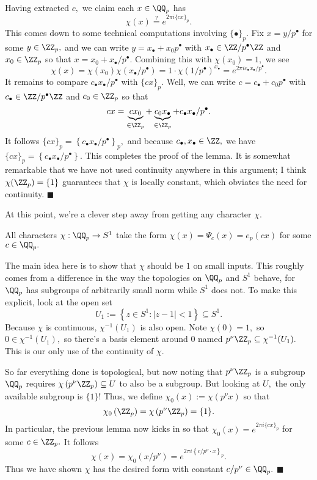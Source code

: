 Having extracted $c,$ we claim each $x\in\QQ_p$ has
\[\chi(x)\stackrel?=e^{2\pi i\{cx\}_p}.\]
This comes down to some technical computations involving $\{\bullet\}_p.$ Fix $x=y/p^\bullet$ for some $y\in\ZZ_p,$ and we can write $y=x_\bullet+x_0p^\bullet$ with $x_\bullet\in\ZZ/p^\bullet\ZZ$ and $x_0\in\ZZ_p$ so that $x=x_0+x_\bullet/p^\bullet.$ Combining this with $\chi(x_0)=1,$ we see
\[\chi(x)=\chi(x_0)\chi\left(x_\bullet/p^\bullet\right)=1\cdot\chi\left(1/p^\bullet\right)^{x_\bullet}=e^{2\pi ic_\bullet x_\bullet/p^\bullet}.\]
It remains to compare $c_\bullet x_\bullet/p^\bullet$ with $\{cx\}_p.$ Well, we can write $c=c_\bullet+c_0p^\bullet$ with $c_\bullet\in\ZZ/p^\bullet\ZZ$ and $c_0\in\ZZ_p$ so that
\[cx=\underbrace{cx_0}_{\in\ZZ_p}+\underbrace{c_0x_\bullet}_{\in\ZZ_p}+c_\bullet x_\bullet/p^\bullet.\]
It follows $\{cx\}_p=\left\{c_\bullet x_\bullet/p^\bullet\right\}_p,$ and because $c_\bullet,x_\bullet\in\ZZ,$ we have $\{cx\}_p=\left\{c_\bullet x_\bullet/p^\bullet\right\}.$ This completes the proof of the lemma. It is somewhat remarkable that we have not used continuity anywhere in this argument; I think $\chi(\ZZ_p)=\{1\}$ guarantees that $\chi$ is locally constant, which obviates the need for continuity. $\blacksquare$

At this point, we're a clever step away from getting any character $\chi.$
\begin{lemma}
    All characters $\chi:\QQ_p\to S^1$ take the form $\chi(x)=\Psi_c(x)=e_p(cx)$ for some $c\in\QQ_p.$
\end{lemma}
The main idea here is to show that $\chi$ should be $1$ on small inputs. This roughly comes from a difference in the way the topologies on $\QQ_p$ and $S^1$ behave, for $\QQ_p$ has subgroups of arbitrarily small norm while $S^1$ does not. To make this explicit, look at the open set
\[U_1:=\left\{z\in S^1:|z-1|<1\right\}\subseteq S^1.\]
Because $\chi$ is continuous, $\chi^{-1}(U_1)$ is also open. Note $\chi(0)=1,$ so $0\in\chi^{-1}(U_1),$ so there's a basis element around $0$ named $p^\nu\ZZ_p\subseteq\chi^{-1}(U_1).$ This is our only use of the continuity of $\chi.$

So far everything done is topological, but now noting that $p^\nu\ZZ_p$ is a subgroup $\QQ_p$ requires $\chi\left(p^\nu\ZZ_p\right)\subseteq U$ to also be a subgroup. But looking at $U,$ the only available subgroup is $\{1\}$! Thus, we define $\chi_0(x):=\chi\left(p^\nu x\right)$ so that
\[\chi_0\left(\ZZ_p\right)=\chi\left(p^\nu\ZZ_p\right)=\{1\}.\]
In particular, the previous lemma now kicks in so that $\chi_0(x)=e^{2\pi i\{cx\}_p}$ for some $c\in\ZZ_p.$ It follows
\[\chi(x)=\chi_0\left(x/p^\nu\right)=e^{2\pi i\left\{c/p^\nu\cdot x\right\}_p}.\]
Thus we have shown $\chi$ has the desired form with constant $c/p^\nu\in\QQ_p.$ $\blacksquare$


